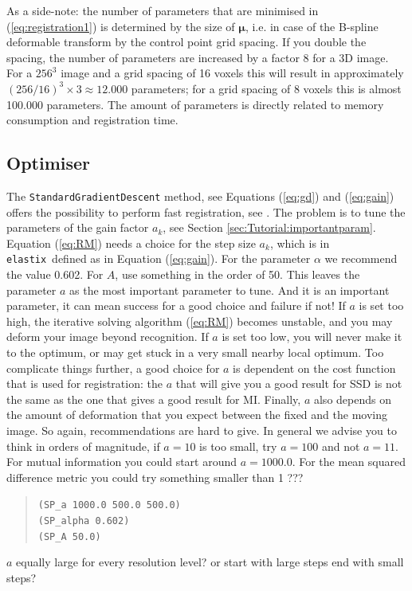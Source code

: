 \documentclass[]{report}
\newcommand{\elastix}{\texttt{elastix}}
\newcommand{\vmu}{\bm{\mu}}
\begin{document}
As a side-note: the number of parameters that are minimised in
(\ref{eq:registration1}) is determined by the size of $\vmu$, i.e. in
case of the B-spline deformable transform by the control point grid
spacing. If you double the spacing, the number of parameters are
increased by a factor 8 for a 3D image. For a $256^3$ image and a
grid spacing of 16 voxels this will result in approximately
$(256/16)^3 \times 3 \approx 12.000$ parameters; for a grid spacing
of 8 voxels this is almost 100.000 parameters. The amount of
parameters is directly related to memory consumption and registration
time.

\subsection{Optimiser}

The \texttt{StandardGradientDescent} method, see Equations
(\ref{eq:gd}) and (\ref{eq:gain}) offers the possibility to perform
fast registration, see \cite{KleinEA07}. The problem is to tune the
parameters of the gain factor $a_k$, see Section
\ref{sec:Tutorial:importantparam}. Equation (\ref{eq:RM}) needs a
choice for the step size $a_k$, which is in \elastix\ defined as in
Equation (\ref{eq:gain}). For the parameter $\alpha$ we recommend the
value 0.602. For $A$, use something in the order of 50. This leaves
the parameter $a$ as the most important parameter to tune. And it is
an important parameter, it can mean success for a good choice and
failure if not! If $a$ is set too high, the iterative solving
algorithm (\ref{eq:RM}) becomes unstable, and you may deform your
image beyond recognition. If $a$ is set too low, you will never make
it to the optimum, or may get stuck in a very small nearby local
optimum. Too complicate things further, a good choice for $a$ is
dependent on the cost function that is used for registration: the $a$
that will give you a good result for SSD is not the same as the one
that gives a good result for MI. Finally, $a$ also depends on the
amount of deformation that you expect between the fixed and the
moving image. So again, recommendations are hard to give. In general
we advise you to think in orders of magnitude, if $a = 10$ is too
small, try $a = 100$ and not $a = 11$. For mutual information you
could start around $a = 1000.0$. For the mean squared difference
metric you could try something smaller than 1 ???
\begin{quote}
\texttt{(SP\_a 1000.0 500.0 500.0)} \\
\texttt{(SP\_alpha 0.602)} \\
\texttt{(SP\_A 50.0)}
\end{quote}
$a$ equally large for every resolution level? or start with large
steps end with small steps?
\end{document}
